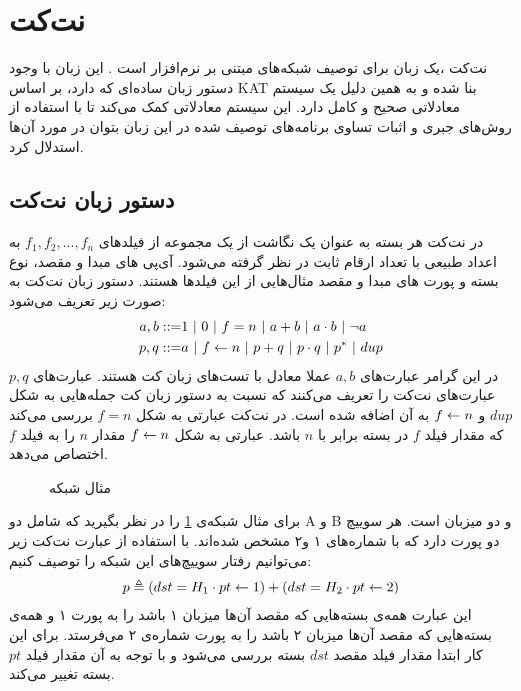 \section{نت‌کت }
نت‌کت
،یک زبان برای توصیف شبکه‌های مبتنی بر نرم‌افزار است
\cite{netkat}.
این زبان با وجود دستور زبان%
ساده‌ای که دارد، بر اساس
KAT
\cite{kat}
بنا شده و به همین دلیل یک سیستم معادلاتی صحیح و کامل%
دارد.
این سیستم معادلاتی کمک می‌کند تا با استفاده از روش‌های جبری و اثبات تساوی برنامه‌های توصیف شده در این زبان بتوان در مورد آن‌ها استدلال کرد.

\subsection{دستور زبان نت‌کت}
در نت‌کت هر بسته
به عنوان یک نگاشت از یک مجموعه از فیلد‌های
$f_1,f_2,...,f_n$
به اعداد طبیعی با تعداد ارقام ثابت در نظر گرفته می‌شود.
آی‌پی‌%
های مبدا و مقصد، نوع بسته و پورت‌%
های مبدا و مقصد مثال‌هایی از این فیلد‌ها هستند.
دستور زبان نت‌کت به صورت زیر تعریف می‌شود:
\begin{align*}
    a,b ::= & 1 ~|~ 0 ~|~ f = n ~|~ a + b ~|~ a \cdot b ~|~ \neg a  \\
    p,q ::= & a ~|~ f \leftarrow n ~|~ p + q ~|~ p \cdot q ~|~ p^* ~|~ dup
\end{align*}
در این گرامر عبارت‌های
$a,b$
عملا معادل با تست‌های زبان کت%
هستند.
عبارت‌های
$p,q$
عبارت‌های نت‌کت را تعریف می‌کنند که نسبت به دستور زبان کت
جمله‌هایی به شکل
$dup$
و
$f \leftarrow n$
به آن اضافه شده است.
در نت‌کت عبارتی به شکل 
$f = n$
بررسی می‌کند که مقدار فیلد 
$f$
در بسته برابر با 
$n$
باشد.
عبارتی به شکل 
$f \leftarrow n$
مقدار 
$n$
را به فیلد 
$f$
اختصاص می‌دهد.
\begin{figure}
    \centering
    \caption{مثال شبکه}
    \label{fig:netkat:ssh}
\end{figure}
برای مثال شبکه‌ی
\ref{fig:netkat:ssh}
را در نظر بگیرید که شامل دو%
A و ‌B
و دو میزبان%
است.
هر سوییچ دو پورت دارد که با شماره‌های ۱ و۲ مشخص شده‌اند.
با استفاده از عبارت نت‌کت زیر می‌توانیم رفتار سوییچ‌های این شبکه را توصیف کنیم:
\begin{align}
    \label{eq:netkat:swp}
    p \triangleq (dst = H_1 \cdot pt \leftarrow 1) +
    (dst = H_2 \cdot pt \leftarrow 2)
\end{align}
این عبارت همه‌ی بسته‌هایی که مقصد آن‌ها میزبان ۱ باشد را به پورت ۱ و همه‌ی بسته‌هایی که مقصد‌ آن‌ها میزبان ۲ باشد را به پورت شماره‌ی ۲ می‌فرستد.
برای این کار ابتدا مقدار فیلد مقصد 
$dst$
بسته بررسی می‌شود و با توجه به آن مقدار فیلد 
$pt$ 
بسته تغییر می‌کند.


